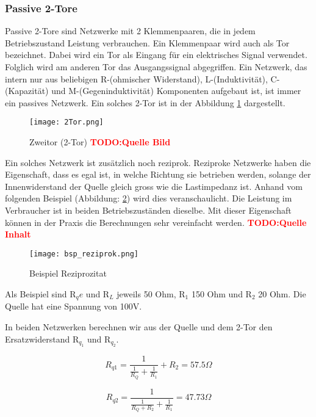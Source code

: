  \subsubsection{Passive 2-Tore} \label{subsubsec:2tore}
  
Passive 2-Tore sind Netzwerke mit 2 Klemmenpaaren, die in jedem Betriebszustand Leistung verbrauchen. Ein Klemmenpaar wird auch als Tor bezeichnet. Dabei wird ein Tor als Eingang für ein elektrisches Signal verwendet. Folglich wird am anderen Tor das Ausgangssignal abgegriffen. Ein Netzwerk, das intern nur aus beliebigen R-(ohmischer Widerstand), L-(Induktivität), C-(Kapazität) und M-(Gegeninduktivität) Komponenten aufgebaut ist, ist immer ein passives Netzwerk. Ein solches 2-Tor ist in der Abbildung \ref{fig:2tor} dargestellt.

\begin{figure}[H]
	\centering
	\texttt{[image: 2Tor.png]}
	\caption{Zweitor (2-Tor) \textcolor{red}{\textbf{TODO:Quelle Bild}} }
	\label{fig:2tor}
\end{figure}

Ein solches Netzwerk ist zusätzlich noch reziprok. Reziproke Netzwerke haben die Eigenschaft, dass es egal ist, in welche Richtung sie betrieben werden, solange der Innenwiderstand der Quelle gleich gross wie die Lastimpedanz ist. Anhand vom folgenden Beispiel (Abbildung: \ref{fig:reziprozitat}) wird dies veranschaulicht. Die Leistung im Verbraucher ist in beiden Betriebszuständen dieselbe. Mit dieser Eigenschaft können in der  Praxis die Berechnungen sehr vereinfacht werden. \textcolor{red}{\textbf{TODO:Quelle Inhalt}}

\begin{figure}[H]
	\centering
	\texttt{[image: bsp\_reziprok.png]}
	\caption{Beispiel Reziprozitat}
	\label{fig:reziprozitat}
\end{figure}


Als Beispiel sind R$_qe$ und R$_L$ jeweils 50 Ohm, R$_1$ 150 Ohm und R$_2$ 20 Ohm. Die Quelle hat eine Spannung von 100V.

In beiden Netzwerken berechnen wir aus der Quelle und dem 2-Tor den Ersatzwiderstand  R$_q_1$ und R$_q_2$.


\begin{equation}\label{equ:rqe1}
			R_{q1} = \frac{1}{\frac{1}{R_Q}+\frac{1}{R_1}} +R_2 =  57.5 \Omega 
		\end{equation}

\begin{equation}\label{equ:rqe1}
			R_{q2} = \frac{1}{\frac{1}{R_Q+R_2}+\frac{1}{R_1}} =  47.73 \Omega 
		\end{equation}
	
